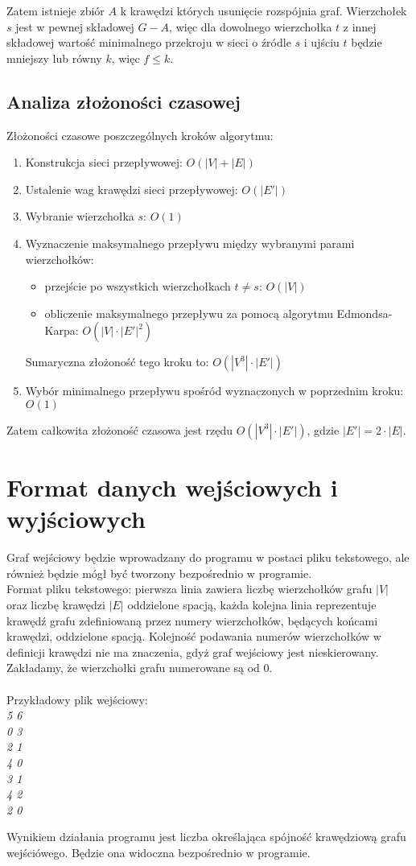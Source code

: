 \documentclass{article}
\begin{document}
Zatem istnieje zbiór $A$ k krawędzi których usunięcie rozspójnia graf. Wierzchołek $s$ jest w pewnej składowej $G-A$, więc dla dowolnego wierzchołka $t$ z innej składowej wartość minimalnego przekroju w sieci o źródle $s$ i ujściu $t$ będzie mniejszy lub równy $k$, więc $f \le k$.


\subsection{Analiza złożoności czasowej}


Złożoności czasowe poszczególnych kroków algorytmu: 
\begin{enumerate}
\item Konstrukcja sieci przepływowej: $O(|V|+|E|)$
\item Ustalenie wag krawędzi sieci przepływowej: $O(|E'|)$
\item Wybranie wierzchołka $s$: $O(1)$
\item Wyznaczenie maksymalnego przepływu między wybranymi parami wierzchołków: 
\begin{itemize}
    \item przejście po wszystkich wierzchołkach $t \neq s$: $O(|V|)$
    \item obliczenie maksymalnego przepływu za pomocą algorytmu Edmondsa-Karpa: $O(|V|\cdot|E'|^{2})$
\end{itemize}
Sumaryczna złożoność tego kroku to: $O(|V^{3}|\cdot|E'|)$
\item Wybór minimalnego przepływu spośród wyznaczonych w poprzednim kroku: $O(1)$
\end{enumerate}
Zatem całkowita złożoność czasowa jest rzędu $O(|V^{3}|\cdot|E'|)$, gdzie $|E'|=2\cdot |E|$.\\


\section{Format danych wejściowych i wyjściowych}
Graf wejściowy będzie wprowadzany do programu w postaci pliku tekstowego, ale również będzie mógł być tworzony bezpośrednio w programie.\\

Format pliku tekstowego: pierwsza linia zawiera liczbę wierzchołków grafu $|V|$ oraz liczbę krawędzi $|E|$ oddzielone spacją, każda kolejna linia reprezentuje krawędź grafu zdefiniowaną przez numery wierzchołków, będących końcami krawędzi, oddzielone spacją. Kolejność podawania numerów wierzchołków w definicji krawędzi nie ma znaczenia, gdyż graf wejściowy jest nieskierowany. Zakładamy, że wierzchołki grafu numerowane są od 0.
\\\\
Przykładowy plik wejściowy:\\
\textit{5 6\\
0 3\\
2 1\\
4 0\\
3 1\\
4 2\\
2 0\\
}


Wynikiem działania programu jest liczba określająca spójność krawędziową grafu wejściówego. Będzie ona widoczna bezpośrednio w programie.
\end{document}
